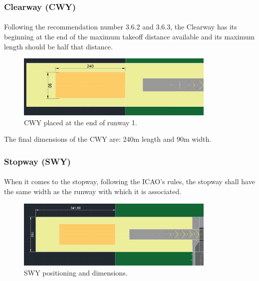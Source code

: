 			\subsubsection{Clearway (CWY)}
			\paragraph{}Following the recommendation number 3.6.2 and 3.6.3, the Clearway has its beginning at the end of the maximum takeoff distance available and its maximum length should be half that distance.
			
			\begin{figure}[H]
				\centering
				\includegraphics[clip, trim=0cm 0cm 0cm 0cm, width=0.85\textwidth]{./images/declareddistances/CWY}
				\caption{CWY placed at the end of runway 1.} %
				\label{} %
			\end{figure}
			
			The final dimensions of the CWY are: 240m length and 90m width. 
			
			\subsubsection{Stopway (SWY)}
			\paragraph{}When it comes to the stopway, following the ICAO's rules, the stopway shall have the same width as the runway with which it is associated.

			\begin{figure}[H]
				\centering
				\includegraphics[clip, trim=0cm 0cm 0cm 0cm, width=0.85\textwidth]{./images/declareddistances/SWY}
				\caption{SWY positioning and dimensions.} %
				\label{} %
			\end{figure}
		
